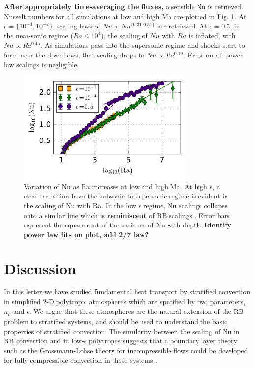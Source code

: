 \documentclass[aps, prl, twocolumn, nofootinbib, groupedaddress, amsfonts, amssymb, amsmath]{revtex4-1}
\newcommand{\nrho}{\ensuremath{n_{\rho}}}
\begin{document}
\textbf{After appropriately time-averaging the fluxes,} a sensible Nu is retrieved.  Nusselt numbers for
all simulations at low and high Ma are plotted in Fig. \ref{fig:nu_v_ra}.  At $\epsilon = \{10^{-4}, 10^{-7}\}$,
scaling laws of $Nu \propto Nu^{\{0.31, 0.31\}}$ are retrieved.  At $\epsilon = 0.5$, in the near-sonic
regime ($Ra \leq 10^4$), the scaling of $Nu$ with $Ra$ is inflated, with $Nu \propto Ra^{0.45}$.  As simulations
pass into the supersonic regime and shocks start to form near the downflows,
that scaling drops to $Nu \propto Ra^{0.19}$.  Error on all power law scalings is negligible.

\begin{figure}[t]
\includegraphics[width=3.4375in]{./figs/nu_v_ra.png}
\caption{Variation of Nu as Ra increases at low and high Ma. 
At high $\epsilon$, a clear transition from the subsonic to supersonic regime is evident in the scaling
of Nu with Ra.  In the low $\epsilon$ regime, Nu scalings collapse onto a similar line which is
\textbf{reminiscent} of RB scalings \cite{johnston&doering2009}.  Error bars represent the square root of
the variance of Nu with depth. \textbf{Identify power law fits on plot, add 2/7 law?}
\label{fig:nu_v_ra} }
\end{figure}

\section{Discussion}
\label{sec:discussion}
In this letter we have studied fundamental heat transport by stratified convection in simplified 2-D polytropic
atmospheres which are specified by two parameters, $\nrho$ 
and $\epsilon$.  We argue that these atmospheres are the natural extension
of the RB problem to stratified systems, and should be used to understand the basic properties of stratified
convection.  The similarity between the scaling of Nu in RB convection and in low-$\epsilon$ polytropes suggests 
that a boundary layer theory such as the Grossmann-Lohse theory for incompressible flows
could be developed for fully compressible convection in these systems \cite{ahlers&all2009}.  
\end{document}
